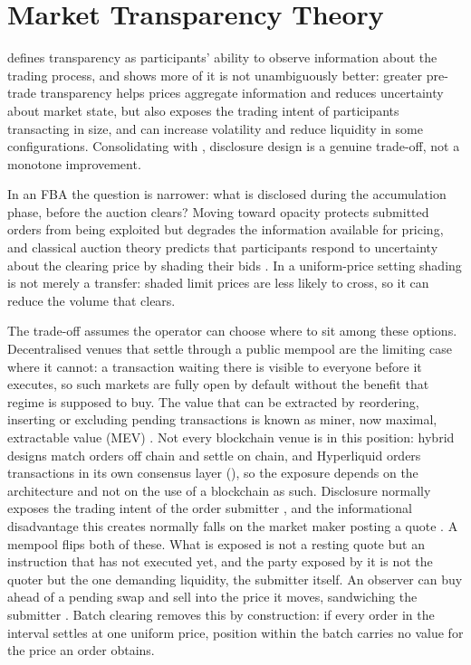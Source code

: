 \section{Market Transparency Theory}
\label{sec:transparency}

\citet{madhavan1996transparency} defines transparency as participants'
ability to observe information about the trading process, and shows more
of it is not unambiguously better: greater pre-trade transparency helps
prices aggregate information and reduces uncertainty about market state,
but also exposes the trading intent of participants transacting in size,
and can increase volatility and reduce liquidity in some configurations.
Consolidating with \citet{ohara1995microstructure}, disclosure design is
a genuine trade-off, not a monotone improvement.

In an FBA the question is narrower: what is disclosed during the
accumulation phase, before the auction clears? Moving toward opacity
protects submitted orders from being exploited but degrades the
information available for pricing, and classical auction theory predicts
that participants respond to uncertainty about the clearing price by
shading their bids \citep{klemperer1999auction}. In a uniform-price
setting shading is not merely a transfer: shaded limit prices are less
likely to cross, so it can reduce the volume that clears.

The trade-off assumes the operator can choose where to sit among these
options. Decentralised venues that settle through a public mempool are
the limiting case where it cannot: a transaction waiting there is visible
to everyone before it executes, so such markets are fully open by default
without the benefit that regime is supposed to buy. The value that can be
extracted by reordering, inserting or excluding pending transactions is
known as miner, now maximal, extractable value (MEV) \citep{daian2020flash}. Not every
blockchain venue is in this position: hybrid designs match orders off
chain and settle on chain, and Hyperliquid orders transactions in its own
consensus layer (), so the exposure depends on the
architecture and not on the use of a blockchain as such. Disclosure normally exposes the trading intent of the order submitter
\citep{madhavan1996transparency}, and the informational disadvantage this
creates normally falls on the market maker posting a quote
\citep{glosten1985bid}. A mempool flips both of these. What is exposed is
not a resting quote but an instruction that has not executed yet, and the
party exposed by it is not the quoter but the one demanding liquidity,
the submitter itself. An observer can buy ahead of a pending swap and
sell into the price it moves, sandwiching the submitter
\citep{daian2020flash}. Batch
clearing removes this by construction: if every order in the interval
settles at one uniform price, position within the batch carries no value
for the price an order obtains.


